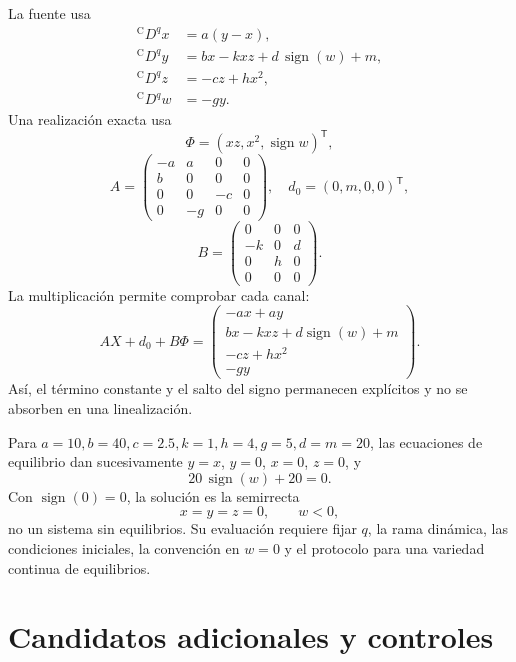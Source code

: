 La fuente \cite{wang2020} usa
\begin{equation}
\begin{aligned}
 {}^{\mathrm C}D^q x&=a(y-x),\\
 {}^{\mathrm C}D^q y&=bx-kxz+d\,\operatorname{sign}(w)+m,\\
 {}^{\mathrm C}D^q z&=-cz+hx^2,\\
 {}^{\mathrm C}D^q w&=-gy.
\end{aligned}
\label{eq:cand-liu}
\end{equation}
Una realización exacta usa
\[
 \Phi=(xz,x^2,\operatorname{sign}w)^{\mathsf T},
\]
\[
 A=\begin{pmatrix}
 -a&a&0&0\\ b&0&0&0\\0&0&-c&0\\0&-g&0&0
 \end{pmatrix},\quad
 d_0=(0,m,0,0)^{\mathsf T},
\]
\[
 B=\begin{pmatrix}
 0&0&0\\-k&0&d\\0&h&0\\0&0&0
 \end{pmatrix}.
\]
La multiplicación permite comprobar cada canal:
\[
 AX+d_0+B\Phi=
 \begin{pmatrix}
 -ax+ay\\bx-kxz+d\operatorname{sign}(w)+m\\-cz+hx^2\\-gy
 \end{pmatrix}.
\]
Así, el término constante y el salto del signo permanecen explícitos y no
se absorben en una linealización.

Para \(a=10,b=40,c=2.5,k=1,h=4,g=5,d=m=20\), las ecuaciones de equilibrio
dan sucesivamente \(y=x\), \(y=0\), \(x=0\), \(z=0\), y
\[
 20\,\operatorname{sign}(w)+20=0.
\]
Con \(\operatorname{sign}(0)=0\), la solución es la semirrecta
\begin{equation}
 x=y=z=0,\qquad w<0,
 \label{eq:cand-liu-equilibria}
\end{equation}
no un sistema sin equilibrios. Su evaluación requiere fijar \(q\), la rama
dinámica, las condiciones iniciales, la convención en \(w=0\) y el protocolo
para una variedad continua de equilibrios.

\HAFOStudyNeedspace
\section{Candidatos adicionales y controles}
\label{sec:candidate-queue}

